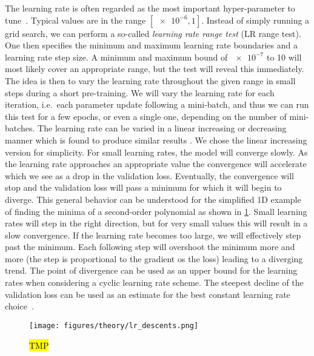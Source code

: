 The learning rate is often regarded as the most important hyper-parameter to
tune~\cite{Bengio2012}. Typical values are in the range $[\num{e-6}, 1]$.
Instead of simply running a grid search, we can perform a so-called \textit{learning rate range test} (LR range test). One then specifies the minimum and maximum learning rate
boundaries and a learning rate step size. A minimum and maximum bound of
$\num{e-7}$ to 10 will most likely cover an appropriate range, but the test will
reveal this immediately. The idea is then to vary the learning rate throughout
the given range in small steps during a short pre-training. We will vary the learning
rate for each iteration, i.e.\ each parameter update following a mini-batch, and
thus we can run this test for a few epochs, or even a single one, depending on
the number of mini-batches. The learning rate can be varied in a linear
increasing or decreasing manner which is found to produce similar results
\cite{smith2017cyclical}. We chose the linear increasing version for
simplicity. For small learning rates, the model will converge slowly. As the
learning rate approaches an appropriate value the convergence will accelerate
which we see as a drop in the validation loss. Eventually, the convergence will
stop and the validation loss will pass a minimum for which it will begin to
diverge. This general behavior can be understood for the simplified 1D example
of finding the minima of a second-order polynomial as shown in
\cref{fig:lr_descents}. Small learning rates will step in the right direction,
but for very small values this will result in a slow convergence. If
the learning rate becomes too large, we will effectively step past the minimum. Each following step will overshoot the minimum more and more (the step is proportional to the gradient os the loss) leading to a diverging
trend. The point of divergence can be used as an upper bound for the learning
rates when considering a cyclic learning rate scheme. The steepest
decline of the validation loss can be used as an estimate for the best constant
learning rate choice~\cite{smith2018disciplined}.


\begin{figure}[H]
  \centering
  \texttt{[image: figures/theory/lr\_descents.png]}
  \caption{\hl{TMP}  }
  \label{fig:lr_descents}
\end{figure}


